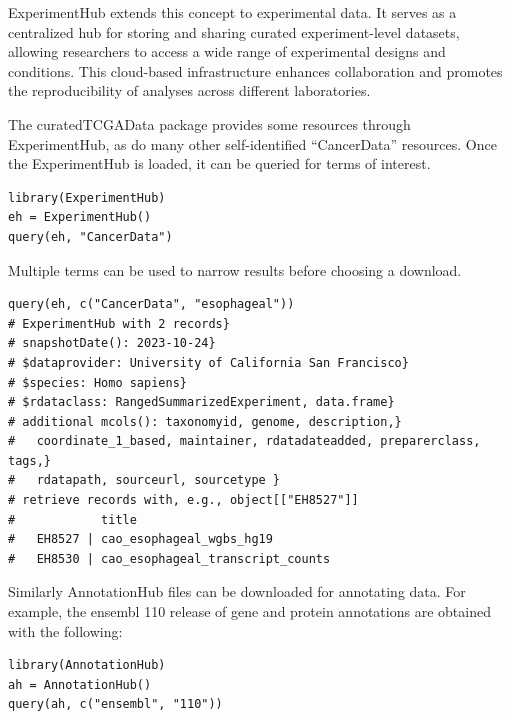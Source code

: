 \documentclass[graybox]{svmult}
\begin{document}
ExperimentHub extends this concept to experimental data. It serves as a
centralized hub for storing and sharing curated experiment-level datasets,
allowing researchers to access a wide range of experimental designs and
conditions. This cloud-based infrastructure enhances collaboration and promotes
the reproducibility of analyses across different laboratories.

The curatedTCGAData package provides some resources through
ExperimentHub, as do many other self-identified ``CancerData'' resources. Once the
ExperimentHub is loaded, it can be queried for terms of interest.

\begin{shaded}
\begin{verbatim}
library(ExperimentHub)
eh = ExperimentHub()
query(eh, "CancerData")
\end{verbatim}
\end{shaded}


Multiple terms can be used to narrow results before choosing a download.

\begin{shaded}
\begin{verbatim}
query(eh, c("CancerData", "esophageal"))
# ExperimentHub with 2 records}
# snapshotDate(): 2023-10-24}
# $dataprovider: University of California San Francisco}
# $species: Homo sapiens}
# $rdataclass: RangedSummarizedExperiment, data.frame}
# additional mcols(): taxonomyid, genome, description,}
#   coordinate_1_based, maintainer, rdatadateadded, preparerclass, tags,}
#   rdatapath, sourceurl, sourcetype }
# retrieve records with, e.g., object[["EH8527"]]
#            title                           
#   EH8527 | cao_esophageal_wgbs_hg19        
#   EH8530 | cao_esophageal_transcript_counts
\end{verbatim}
\end{shaded}

Similarly AnnotationHub files can be downloaded for annotating data. For example,
the ensembl 110 release of gene and protein annotations are obtained with the
following:

\begin{shaded}
\begin{verbatim}
library(AnnotationHub)
ah = AnnotationHub()
query(ah, c("ensembl", "110"))
\end{verbatim}
\end{shaded}





%


\end{document}
